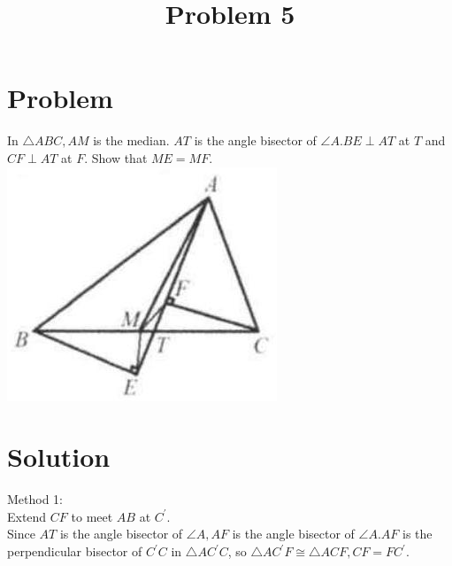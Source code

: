 \documentclass{article}
\title{Problem 5}
\date{}
\begin{document}
\maketitle

\section*{Problem}
In \(\triangle A B C, A M\) is the median. \(A T\) is the angle bisector of \(\angle A . B E \perp A T\) at \(T\) and \(C F \perp A T\) at \(F\). Show that \(M E=M F\).\\
\centering
\includegraphics[width=\textwidth]{images/065(1).jpg}

\section*{Solution}
Method 1:\\
Extend \(C F\) to meet \(A B\) at \(C^{\prime}\).\\
Since \(A T\) is the angle bisector of \(\angle A, A F\) is the angle bisector of \(\angle A . A F\) is the perpendicular bisector of \(C^{\prime} C\) in \(\triangle A C^{\prime} C\), so \(\triangle A C^{\prime} F \cong \triangle A C F, C F=F C^{\prime}\).
\end{document}
